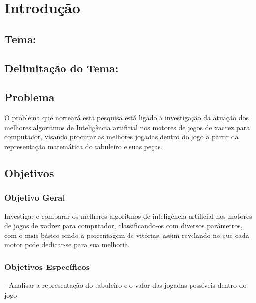 

\chapter{Introdução}
\section[Tema]{Tema: {}}

\section[Delimitação do Tema]{Delimitação do Tema: {}}
\section{Problema}
O problema que norteará esta pesquisa está ligado à investigação da atuação dos melhores algoritmos de Inteligência artificial
nos motores de jogos de xadrez para computador, visando procurar as melhores jogadas dentro do jogo a partir da representação
matemática do tabuleiro e suas peças.
\section{Objetivos}
\subsection{Objetivo Geral}
Investigar e comparar os melhores algoritmos de inteligência artificial nos motores de jogos de xadrez para computador,
classificando-os com diversos parâmetros, com o mais básico sendo a porcentagem de vitórias, assim revelando no que cada
motor pode dedicar-se para sua melhoria.

\subsection{Objetivos Específicos}
- Analisar a representação do tabuleiro e o valor das jogadas possíveis dentro do jogo

